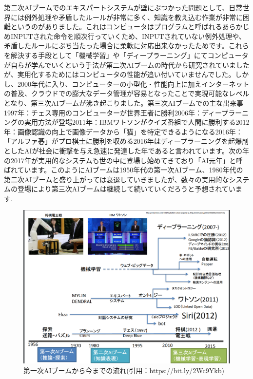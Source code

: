 第二次AIブームでのエキスパートシステムが壁にぶつかった問題として、日常世界には例外処理や矛盾したルールが非常に多く、知識を教え込む作業が非常に困難というのがありました。これはコンピュータはプログラムと呼ばれるあらかじめINPUTされた命令を順次行っていくため、INPUTされていない例外処理や、矛盾したルールにぶち当たった場合に柔軟に対応出来なかったためです。これらを解決する手段として「機械学習」や「ディープラーニング」にてコンピュータが自らが学んでいくという手法が第二次AIブームの時代から研究されていましたが、実用化するためにはコンピュータの性能が追い付いていませんでした。しかし、2000年代に入り、コンピューターの小型化・性能向上に加えインターネットの普及、クラウドでの膨大なデータ管理が容易となったことで実現可能なレベルとなり、第三次AIブームが沸き起こりました。第三次AIブームでの主な出来事1997年：チェス専用のコンピューターが世界王者に勝利2006年：ディープラーニングの実用方法が登場2011年：IBMワトソンがクイズ番組で人間に勝利する2012年：画像認識の向上で画像データから「猫」を特定できるようになる2016年：「アルファ碁」がプロ棋士に勝利を収める2016年はディープラーニングを起爆剤としたAIが社会に衝撃を与え急速に発達した年であると言われています。次の年の2017年が実用的なシステムも世の中に登場し始めてきており「AI元年」と呼ばれています。このようにAIブームは1950年代の第一次AIブーム、1980年代の第二次AIブームと盛り上がっては衰退していきましたが、数々の実用的なシステムの登場により第三次AIブームは継続して続いていくだろうと予想されています.\\
\begin{figure}[h]
    \begin{screen}
    \begin{center}
        \includegraphics[scale=0.4, clip]{./img/AI_History.png}
        \caption{第一次AIブームから今までの流れ\newline(引用：https://bit.ly/2Wc9Ykb)}
        \label{fig:第一次AIブームから今までの流れ}
    \end{center}
\end{screen}
\end{figure}\\

